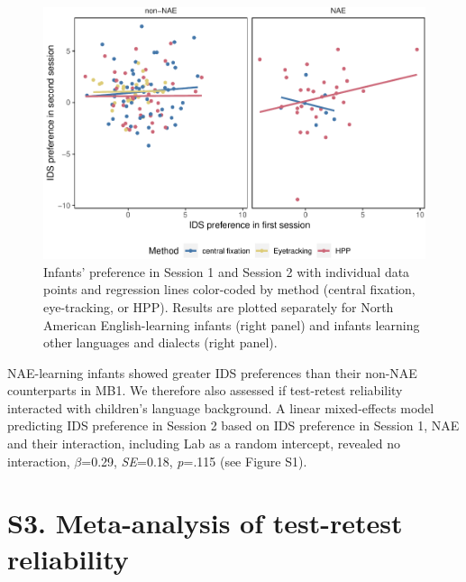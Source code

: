 \documentclass[
  man, donotrepeattitle,floatsintext]{apa6}
\begin{document}
\begin{figure}
\centering
\includegraphics{MB1T_supplement_files/figure-latex/fig1-1.pdf}
\caption{\label{fig:fig1}Infants' preference in Session 1 and Session 2 with individual data points and regression lines color-coded by method (central fixation, eye-tracking, or HPP). Results are plotted separately for North American English-learning infants (right panel) and infants learning other languages and dialects (right panel).}
\end{figure}

NAE-learning infants showed greater IDS preferences than their non-NAE counterparts in MB1. We therefore also assessed if test-retest reliability interacted with children's language background. A linear mixed-effects model predicting IDS preference in Session 2 based on IDS preference in Session 1, NAE and their interaction, including Lab as a random intercept, revealed no interaction, \(\beta\)=0.29, \emph{SE}=0.18, \emph{p}=.115 (see Figure S1).

\hypertarget{s3.-meta-analysis-of-test-retest-reliability}{%
\section{S3. Meta-analysis of test-retest reliability}\label{s3.-meta-analysis-of-test-retest-reliability}}
\end{document}
